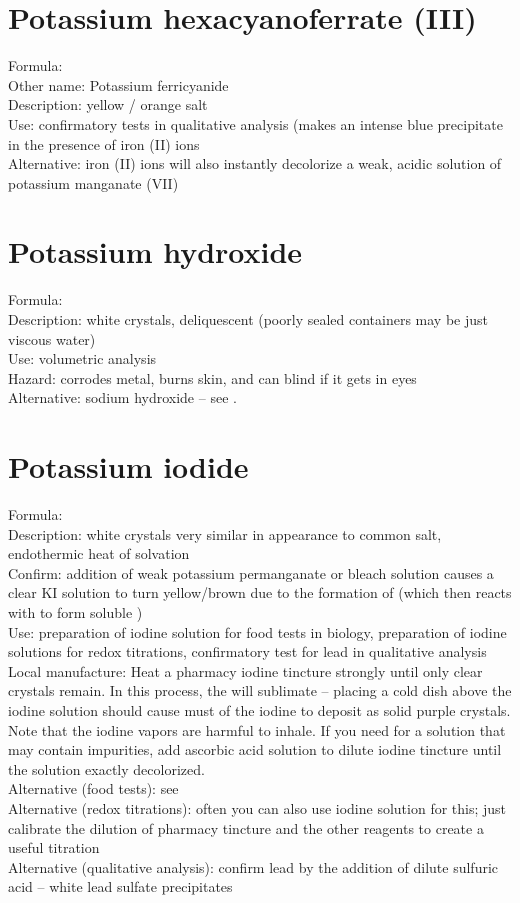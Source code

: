 \section{Potassium hexacyanoferrate (III)}
Formula: \\
Other name: Potassium ferricyanide\\
Description: yellow / orange salt\\
Use: confirmatory tests in qualitative analysis 
(makes an intense blue precipitate in the presence of iron (II) ions\\
Alternative: iron (II) ions will also instantly decolorize a weak, 
acidic solution of potassium manganate (VII)

\section{Potassium hydroxide}
Formula: \\
Description: white crystals, 
deliquescent (poorly sealed containers may be just viscous water)\\
Use: volumetric analysis\\
Hazard: corrodes metal, 
burns skin, 
and can blind if it gets in eyes\\
Alternative: sodium hydroxide -- 
see .

\section{Potassium iodide}
\label{sec:potiodide}
Formula: \\
Description: white crystals very similar in appearance to common salt, 
endothermic heat of solvation\\
Confirm: addition of weak potassium permanganate 
or bleach solution causes a clear KI solution to turn yellow/brown 
due to the formation of  (which then reacts with  to form soluble )\\
Use: preparation of iodine solution for food tests in biology, 
preparation of iodine solutions for redox titrations, 
confirmatory test for lead in qualitative analysis\\
Local manufacture: Heat a pharmacy iodine tincture strongly until 
only clear crystals remain. 
In this process, 
the  will sublimate -- 
placing a cold dish above the iodine solution should cause must of the iodine 
to deposit as solid purple crystals. 
Note that the iodine vapors are harmful to inhale.
If you need  for a solution that may contain impurities, 
add ascorbic acid solution to dilute iodine tincture 
until the solution exactly decolorized.\\
Alternative (food tests): see \\
Alternative (redox titrations): 
often you can also use iodine solution for this; 
just calibrate the dilution of pharmacy tincture 
and the other reagents to create a useful titration\\
Alternative (qualitative analysis): 
confirm lead by the addition of dilute sulfuric acid -- 
white lead sulfate precipitates

